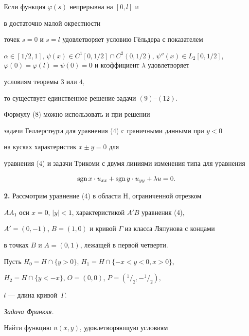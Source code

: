 \begin{thm}


Если функция $\varphi (s)$ непрерывна на $[0,l]$ и


в достаточно малой окрестности


точек $s=0$ и $s=l$ удовлетворяет условию Г\"ельдера с показателем


$\alpha \in [1/2,1]$, $\psi (x)\in C^1[0,1/2]


\cap C^2(0,1/2)$, $\psi ''(x)\in L_2[0,1/2]$, $\varphi (0)=


\varphi (l)=\psi (0)=0$ и коэффициент $\lambda $ удовлетворяет 


условиям теоремы $3$ или $4$,


то существует единственное решение задачи $(9)$--$(12)$.


\end{thm}





Формулу (8) можно использовать и при решении


задачи Геллерстедта для уравнения (4) с граничными данными при $y<0$ 


на кусках характеристик $x\pm y=0$ для


уравнения (4) и задачи Трикоми с двумя линиями изменения типа для уравнения


$$


\sgn x\cdot u_{xx}+\sgn y\cdot u_{yy}+\lambda u=0.


$$ 





{\bf 2.} Рассмотрим уравнение (4) в области $Н$, ограниченной отрезком


$AA_1$ оси $x=0$, $|y|<1$, характеристикой $A'B$ уравнения (4),


$A'=(0,-1)$, $B=(1,0)$ и кривой $\Gamma$ из класса Ляпунова с концами


в точках $B$ и $A=(0,1)$, лежащей в первой четверти.


Пусть $H_0=H\cap \{y>0\}$, $H_1=H\cap \{-x<y<0,x>0\}$,


$H_2=H\cap\{y<-x\}$, $O=(0,0)$, $P=(^1/_2,-^1/_2)$,


$l$ --- длина кривой~$\Gamma$.


\medskip





{\it Задача Франкля.}


Найти функцию $u(x,y)$, удовлетворяющую условиям


